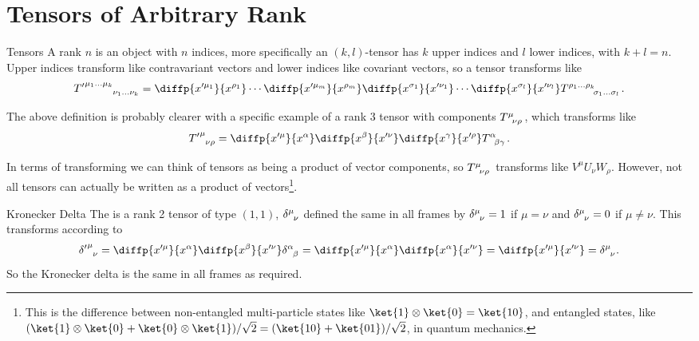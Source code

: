 \documentclass[fleqn]{NotesClass}
\begin{document}
    \section{Tensors of Arbitrary Rank}
    \begin{dfn}{Tensors}{}
        A rank \(n\)  is an object with \(n\) indices, more specifically an \((k, l)\)-tensor has \(k\) upper indices and \(l\) lower indices, with \(k + l = n\).
        Upper indices transform like contravariant vectors and lower indices like covariant vectors, so a tensor transforms like
        \begin{equation}
            \tensor{{T'}}{^{\mu_1 \dotso \mu_k}_{\nu_1 \dotso \nu_k}} = \diffp{x'^{\mu_1}}{x^{\rho_1}} \dotsm \diffp{x'^{\mu_m}}{x^{\rho_m}} \diffp{x^{\sigma_1}}{x'^{\nu_1}} \dotsm \diffp{x^{\sigma_l}}{x'^{\nu_l}} \tensor{T}{^{\rho_1\dotso \rho_k}_{\sigma_1\dotso \sigma_l}}.
        \end{equation}
    \end{dfn}
    
    The above definition is probably clearer with a specific example of a rank 3 tensor with components \(\tensor{T}{^\mu_{\nu\rho}}\), which transforms like
    \begin{equation}
        \tensor{{T'}}{^{\mu}_{\nu\rho}} = \diffp{x'^\mu}{x^\alpha} \diffp{x^\beta}{x'^\nu} \diffp{x^\gamma}{x'^\rho} \tensor{T}{^\alpha_{\beta\gamma}}.
    \end{equation}
    
    In terms of transforming we can think of tensors as being a product of vector components, so \(\tensor{T}{^\mu_{\nu\rho}}\) transforms like \(V^\mu U_\nu W_\rho\).
    However, not all tensors can actually be written as a product of vectors\footnote{This is the difference between non-entangled multi-particle states like \(\ket{1} \otimes \ket{0} = \ket{10}\), and entangled states, like \((\ket{1}\otimes \ket{0} + \ket{0}\otimes\ket{1})/\sqrt{2} = (\ket{10} + \ket{01})/\sqrt{2}\), in quantum mechanics.}.
    
    \begin{exm}{Kronecker Delta}{}
        The  is a rank 2 tensor of type \((1, 1)\), \(\tensor{\delta}{^\mu_\nu}\) defined the same in all frames by \(\tensor{\delta}{^\mu_\nu} = 1\) if \(\mu = \nu\) and \(\tensor{\delta}{^\mu_\nu} = 0\) if \(\mu \ne \nu\).
        This transforms according to
        \begin{equation}
            \tensor{{\delta'}}{^\mu_\nu} = \diffp{x'^\mu}{x^\alpha} \diffp{x^\beta}{x'^\nu} \tensor{\delta}{^\alpha_\beta} = \diffp{x'^\mu}{x^\alpha}\diffp{x^\alpha}{x'^\nu} = \diffp{x'^\mu}{x'^\nu} = \tensor{\delta}{^\mu_\nu}.
        \end{equation}
        So the Kronecker delta is the same in all frames as required.
    \end{exm}
    
\end{document}
